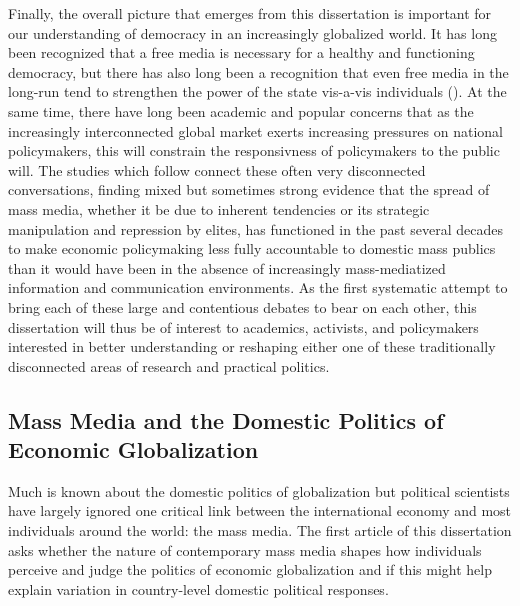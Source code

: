 \documentclass[12pt]{report}
\begin{document}
Finally, the overall picture that emerges from this dissertation is important for our understanding of democracy in an increasingly globalized world. It has long been recognized that a free media is necessary for a healthy and functioning democracy, but there has also long been a recognition that even free media in the long-run tend to strengthen the power of the state vis-a-vis individuals (\citealt{Deutsch:1953ww,Deutsch:1966ux,Camber:2013ul}). At the same time, there have long been academic and popular concerns that as the increasingly interconnected global market exerts increasing pressures on national policymakers, this will constrain the responsivness of policymakers to the public will. The studies which follow connect these often very disconnected conversations, finding mixed but sometimes strong evidence that the spread of mass media, whether it be due to inherent tendencies or its strategic manipulation and repression by elites, has functioned in the past several decades to make economic policymaking less fully accountable to domestic mass publics than it would have been in the absence of increasingly mass-mediatized information and communication environments. As the first systematic attempt to bring each of these large and contentious debates to bear on each other, this dissertation will thus be of interest to academics, activists, and policymakers interested in better understanding or reshaping either one of these traditionally disconnected areas of research and practical politics. 

\subsection{Mass Media and the Domestic Politics of Economic Globalization}

Much is known about the domestic politics of globalization but political scientists
have largely ignored one critical link between the international economy and most individuals around
the world: the mass media. The first article of this dissertation asks whether the nature of contemporary mass media shapes how individuals perceive and judge the politics of economic globalization and if this might help explain variation in country-level domestic political responses.
\end{document}
